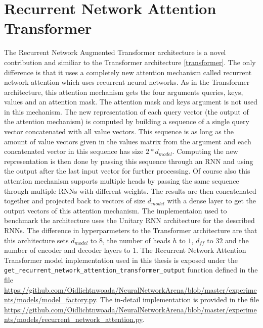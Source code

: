 \documentclass[draft,final]{vutinfth} %
\begin{document}
    \section{Recurrent Network Attention Transformer} \label{rnatt}
    The Recurrent Network Augmented Transformer architecture is a novel contribution and similiar to the Transformer architecture \ref{transformer}.
    The only difference is that it uses a completely new attention mechanism called recurrent network attention which uses recurrent neural networks.
    As in the Transformer architecture, this attention mechanism gets the four arguments queries, keys, values and an attention mask.
    The attention mask and keys argument is not used in this mechanism.
    The new representation of each query vector (the output of the attention mechanism) is computed by building a sequence of a single query vector concatenated with all value vectors.
    This sequence is as long as the amount of value vectors given in the values matrix from the argument and each concatenated vector in this sequence has size $2*d_{model}$.
    Computing the new representation is then done by passing this sequence through an RNN and using the output after the last input vector for further processing.
    Of course also this attention mechanism supports multiple heads by passing the same sequence through multiple RNNs with different weights.
    The results are then concatenated together and projected back to vectors of size $d_{model}$ with a dense layer to get the output vectors of this attention mechanism.
    The implementaion used to benchmark the architecture uses the Unitary RNN architecture for the described RNNs.
    The difference in hyperparmeters to the Transformer architecture are that this architecture sets $d_{model}$ to $8$, the number of heads $h$ to $1$, $d_{ff}$ to $32$ and the number of encoder and decoder layers to $1$.
    The Recurrent Network Attention Transformer model implementation used in this thesis is exposed under the \texttt{get\_recurrent\_network\_attention\_transformer\_output} function defined in the file \url{https://github.com/Oidlichtnwoada/NeuralNetworkArena/blob/master/experiments/models/model_factory.py}.
    The in-detail implementation is provided in the file \url{https://github.com/Oidlichtnwoada/NeuralNetworkArena/blob/master/experiments/models/recurrent_network_attention.py}.
\end{document}
